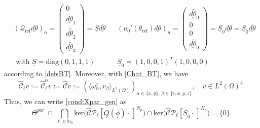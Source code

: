 \documentclass[12pt]{article}
\newcommand\uld[1]{\underline{d#1}}
\newcommand\Proj{\mathcal{P}}
\newcommand\ellnew{\ell}
\newcommand\coilsens{\omega}
\newcommand\hrefprime{\mathcal{Q}_{\text{ref}}}
\newcommand\vecr{\vec{x}}
\newcommand\ulQ{\underline{Q}}
\newcommand\Ncont{N_p}
\begin{document}
\[
\begin{aligned}
&
(\hrefprime\uld{\theta})_n
=\begin{pmatrix}
0\\
\uld{\tilde{\theta}}_1\\
\uld{\tilde{\theta}}_2\\
\uld{\tilde{\theta}}_3
\end{pmatrix}
=\underline{S}\uld{\tilde{\theta}}
&&
(u_0'(\theta_{\text{ref}})\uld{\theta})_n
=
\begin{pmatrix}
\uld{\tilde{\theta}}_0\\0\\0\\ \uld{\tilde{\theta}}_0
\end{pmatrix} 
=\underline{S}_0\uld{\theta}=\underline{S}_0\uld{\tilde{\theta}}\\
&\text{ with }\underline{S}=\text{diag}(0,1,1,1)
&&
\underline{S}_0=(1,0,0,1)^T (1,0,0,0)
\end{aligned}
\]
according to \eqref{defsBT}. Moreover, with \eqref{Chat_BT}, we have
\[
\hat{\mathcal{C}}_\ellnew v := \hat{\mathcal{C}}_\ellnew^0 v := 
\hat{\mathcal{C}} v := 
\left(\langle \coilsens^j_\alpha,v_\beta\rangle_{L^2(\Omega)}\right)_{\alpha\in\{x,y\},\,\beta\in\{e,x,y,z\}}
,\quad v\in L^2(\Omega)^4. 
\]
Thus, we can write \eqref{cond:Xpar_gen} as
\begin{equation*}%
\Theta^{par}\,\cap\,\bigcap_{\ell\in\mathbb{N}_0} 
\text{ker}\bigl(\hat{\mathcal{C}} \Proj_\ell [\ulQ(\underline{\phi})\cdot\,]^{\Ncont}\bigr)\cap 
\text{ker}\bigl(\hat{\mathcal{C}} \Proj_\ell [\underline{S}_0 \cdot\,]^{\Ncont}\bigr)
=\{0\}.
\end{equation*}
\end{document}
